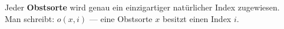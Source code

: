 \begin{axiom}\label{ax:obstsorte-index}
Jeder \textbf{Obstsorte} wird genau ein einzigartiger natürlicher Index zugewiesen.\\
Man schreibt: $o(x, i)$ --- eine Obstsorte $x$ besitzt einen Index $i$.
\end{axiom}
